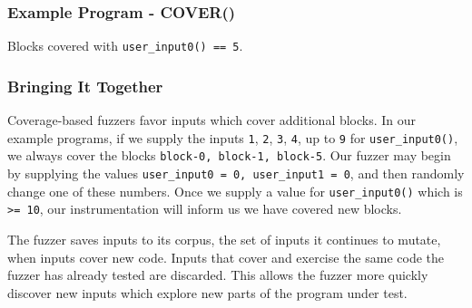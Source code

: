 \documentclass{beamer}
\def\code#1{\scriptsize{\texttt{#1}}}
\begin{document}
\begin{frame}[fragile]
\frametitle{Example Program - COVER()}

Blocks covered with \texttt{user\_input0() == 5}.

\begin{center}
\end{center}
\end{frame}


\begin{frame}
\frametitle{Bringing It Together}
Coverage-based fuzzers favor inputs which cover additional blocks. In our example programs, if we supply the inputs \texttt{1}, \texttt{2}, \texttt{3}, \texttt{4}, up to \texttt{9} for \texttt{user\_input0()}, we always cover the blocks \texttt{{block-0, block-1, block-5}}. Our fuzzer may begin by supplying the values \texttt{{user\_input0 = 0, user\_input1 = 0}}, and then randomly change one of these numbers. Once we supply a value for \texttt{user\_input0()} which is \texttt{>= 10}, our instrumentation will inform us we have covered new blocks.

The fuzzer saves inputs to its corpus, the set of inputs it continues to mutate, when inputs cover new code. Inputs that cover and exercise the same code the fuzzer has already tested are discarded. This allows the fuzzer more quickly discover new inputs which explore new parts of the program under test.
\end{frame}
\end{document}

